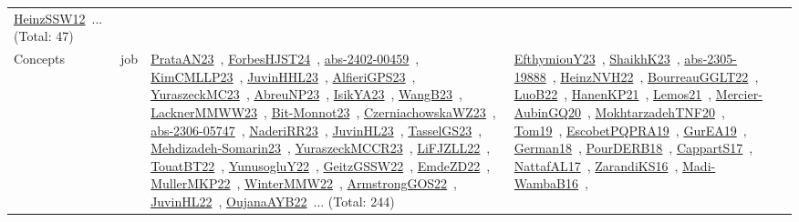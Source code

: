 {\begin{longtable}{lp{3cm}>{\raggedright\arraybackslash}p{6cm}>{\raggedright\arraybackslash}p{6cm}>{\raggedright\arraybackslash}p{8cm}}
\href{works/HeinzSSW12.pdf}{HeinzSSW12}~\cite{HeinzSSW12}... (Total: 47)\\
Concepts & job & \href{works/PrataAN23.pdf}{PrataAN23}~\cite{PrataAN23}, \href{works/ForbesHJST24.pdf}{ForbesHJST24}~\cite{ForbesHJST24}, \href{works/abs-2402-00459.pdf}{abs-2402-00459}~\cite{abs-2402-00459}, \href{works/KimCMLLP23.pdf}{KimCMLLP23}~\cite{KimCMLLP23}, \href{works/JuvinHHL23.pdf}{JuvinHHL23}~\cite{JuvinHHL23}, \href{works/AlfieriGPS23.pdf}{AlfieriGPS23}~\cite{AlfieriGPS23}, \href{works/YuraszeckMC23.pdf}{YuraszeckMC23}~\cite{YuraszeckMC23}, \href{works/AbreuNP23.pdf}{AbreuNP23}~\cite{AbreuNP23}, \href{works/IsikYA23.pdf}{IsikYA23}~\cite{IsikYA23}, \href{works/WangB23.pdf}{WangB23}~\cite{WangB23}, \href{works/LacknerMMWW23.pdf}{LacknerMMWW23}~\cite{LacknerMMWW23}, \href{works/Bit-Monnot23.pdf}{Bit-Monnot23}~\cite{Bit-Monnot23}, \href{works/CzerniachowskaWZ23.pdf}{CzerniachowskaWZ23}~\cite{CzerniachowskaWZ23}, \href{works/abs-2306-05747.pdf}{abs-2306-05747}~\cite{abs-2306-05747}, \href{works/NaderiRR23.pdf}{NaderiRR23}~\cite{NaderiRR23}, \href{works/JuvinHL23.pdf}{JuvinHL23}~\cite{JuvinHL23}, \href{works/TasselGS23.pdf}{TasselGS23}~\cite{TasselGS23}, \href{works/Mehdizadeh-Somarin23.pdf}{Mehdizadeh-Somarin23}~\cite{Mehdizadeh-Somarin23}, \href{works/YuraszeckMCCR23.pdf}{YuraszeckMCCR23}~\cite{YuraszeckMCCR23}, \href{works/LiFJZLL22.pdf}{LiFJZLL22}~\cite{LiFJZLL22}, \href{works/TouatBT22.pdf}{TouatBT22}~\cite{TouatBT22}, \href{works/YunusogluY22.pdf}{YunusogluY22}~\cite{YunusogluY22}, \href{works/GeitzGSSW22.pdf}{GeitzGSSW22}~\cite{GeitzGSSW22}, \href{works/EmdeZD22.pdf}{EmdeZD22}~\cite{EmdeZD22}, \href{works/MullerMKP22.pdf}{MullerMKP22}~\cite{MullerMKP22}, \href{works/WinterMMW22.pdf}{WinterMMW22}~\cite{WinterMMW22}, \href{works/ArmstrongGOS22.pdf}{ArmstrongGOS22}~\cite{ArmstrongGOS22}, \href{works/JuvinHL22.pdf}{JuvinHL22}~\cite{JuvinHL22}, \href{works/OujanaAYB22.pdf}{OujanaAYB22}~\cite{OujanaAYB22}... (Total: 244) & \href{works/EfthymiouY23.pdf}{EfthymiouY23}~\cite{EfthymiouY23}, \href{works/ShaikhK23.pdf}{ShaikhK23}~\cite{ShaikhK23}, \href{works/abs-2305-19888.pdf}{abs-2305-19888}~\cite{abs-2305-19888}, \href{works/HeinzNVH22.pdf}{HeinzNVH22}~\cite{HeinzNVH22}, \href{works/BourreauGGLT22.pdf}{BourreauGGLT22}~\cite{BourreauGGLT22}, \href{works/LuoB22.pdf}{LuoB22}~\cite{LuoB22}, \href{works/HanenKP21.pdf}{HanenKP21}~\cite{HanenKP21}, \href{works/Lemos21.pdf}{Lemos21}~\cite{Lemos21}, \href{works/Mercier-AubinGQ20.pdf}{Mercier-AubinGQ20}~\cite{Mercier-AubinGQ20}, \href{works/MokhtarzadehTNF20.pdf}{MokhtarzadehTNF20}~\cite{MokhtarzadehTNF20}, \href{works/Tom19.pdf}{Tom19}~\cite{Tom19}, \href{works/EscobetPQPRA19.pdf}{EscobetPQPRA19}~\cite{EscobetPQPRA19}, \href{works/GurEA19.pdf}{GurEA19}~\cite{GurEA19}, \href{works/German18.pdf}{German18}~\cite{German18}, \href{works/PourDERB18.pdf}{PourDERB18}~\cite{PourDERB18}, \href{works/CappartS17.pdf}{CappartS17}~\cite{CappartS17}, \href{works/NattafAL17.pdf}{NattafAL17}~\cite{NattafAL17}, \href{works/ZarandiKS16.pdf}{ZarandiKS16}~\cite{ZarandiKS16}, \href{works/Madi-WambaB16.pdf}{Madi-WambaB16}~\cite{Madi-WambaB16}, 
\end{longtable}}
